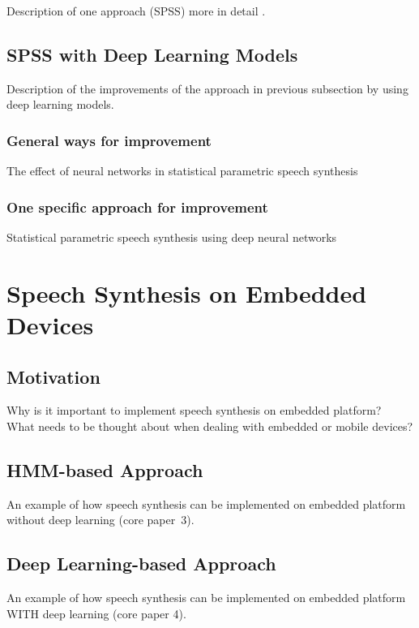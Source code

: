 Description of one approach (\ac{SPSS}) more in detail \cite{zen:statistical}.

\subsection{\ac{SPSS} with Deep Learning Models}
\label{subsec:deepspeech}

Description of the improvements of the approach in previous subsection by using deep learning models.

\subsubsection{General ways for improvement}

The effect of neural networks in statistical parametric speech synthesis \cite{hashimoto:effect}

\subsubsection{One specific approach for improvement}

Statistical parametric speech synthesis using deep neural networks \cite{zen:deepstatistical}

\section{Speech Synthesis on Embedded Devices}
\label{sec:embeddedspeech}

\subsection{Motivation}
\label{subsec:motembedded}

Why is it important to implement speech synthesis on embedded platform?\\
What needs to be thought about when dealing with embedded or mobile devices?

\subsection{\ac{HMM}-based Approach}
\label{subsec:hmmembedded}

An example of how speech synthesis can be implemented on embedded platform without deep learning (core paper~3).

\subsection{Deep Learning-based Approach}
\label{subsec:deepembedded}

An example of how speech synthesis can be implemented on embedded platform WITH deep learning (core paper 4).

\clearpage